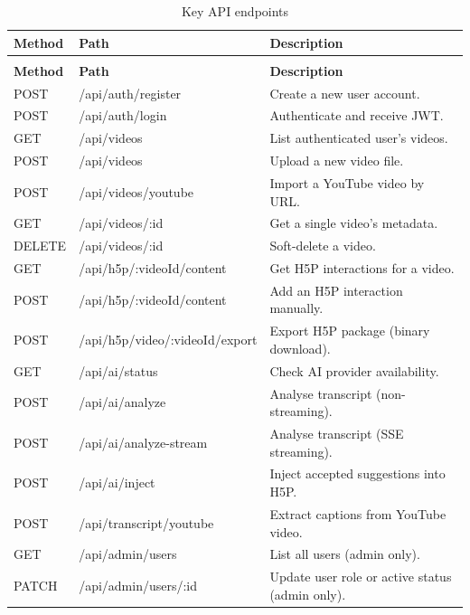 \footnotesize
\begin{longtable}{>{\raggedright\arraybackslash}p{1.6cm} >{\raggedright\arraybackslash}p{5.0cm} >{\raggedright\arraybackslash}p{8.1cm}}
  \caption{Key API endpoints} \label{tab:api_ref} \\
  \toprule
  \textbf{Method} & \textbf{Path} & \textbf{Description} \\
  \midrule
  \endfirsthead
  \multicolumn{3}{c}{\tablename\ \thetable{} (continued)} \\
  \toprule
  \textbf{Method} & \textbf{Path} & \textbf{Description} \\
  \midrule
  \endhead
  \bottomrule
  \endlastfoot
  POST & /api/auth/register        & Create a new user account. \\
  POST & /api/auth/login            & Authenticate and receive JWT. \\
  GET  & /api/videos                & List authenticated user's videos. \\
  POST & /api/videos                & Upload a new video file. \\
  POST & /api/videos/youtube        & Import a YouTube video by URL. \\
  GET  & /api/videos/:id            & Get a single video's metadata. \\
  DELETE & /api/videos/:id          & Soft-delete a video. \\
  GET  & /api/h5p/:videoId/content  & Get H5P interactions for a video. \\
  POST & /api/h5p/:videoId/content  & Add an H5P interaction manually. \\
  POST & /api/h5p/video/:videoId/export & Export H5P package (binary download). \\
  GET  & /api/ai/status             & Check AI provider availability. \\
  POST & /api/ai/analyze            & Analyse transcript (non-streaming). \\
  POST & /api/ai/analyze-stream     & Analyse transcript (SSE streaming). \\
  POST & /api/ai/inject             & Inject accepted suggestions into H5P. \\
  POST & /api/transcript/youtube    & Extract captions from YouTube video. \\
  GET  & /api/admin/users           & List all users (admin only). \\
  PATCH & /api/admin/users/:id      & Update user role or active status (admin only). \\

\end{longtable}

